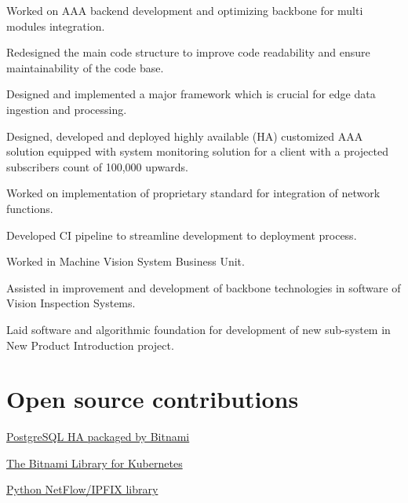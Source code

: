 \documentclass[letterpaper]{deedy-resume} %
\begin{document}
\begin{minipage}[t]{0.66\textwidth}
\vspace{\topsep} %
\begin{tightitemize}
\item Worked on AAA backend development and optimizing backbone for multi modules integration.
\item Redesigned the main code structure to improve code readability and ensure maintainability of the code base.
\item Designed and implemented a major framework which is crucial for edge data ingestion and processing.
\item Designed, developed and deployed highly available (HA) customized AAA solution equipped with system monitoring solution for a client with a projected subscribers count of 100,000 upwards.
\item Worked on implementation of proprietary standard for integration of network functions.
\item Developed CI pipeline to streamline development to deployment process.
\end{tightitemize}

\sectionspace %


\begin{tightitemize}
\item Worked in Machine Vision System Business Unit.
\item Assisted in improvement and development of backbone technologies in software of Vision Inspection Systems.
\item Laid software and algorithmic foundation for development of new sub-system in New Product Introduction project.
\end{tightitemize}

\sectionspace %

\section{Open source contributions} 
\vspace{\topsep}
\begin{tightitemize}
\item \href{https://github.com/bitnami/bitnami-docker-postgresql-repmgr}{PostgreSQL HA packaged by Bitnami} 
\item \href{https://github.com/bitnami/charts}{The Bitnami Library for Kubernetes}
\item \href{https://github.com/bitkeks/python-netflow-v9-softflowd}{Python NetFlow/IPFIX library}
\end{tightitemize}

\end{minipage} %
\end{document}
